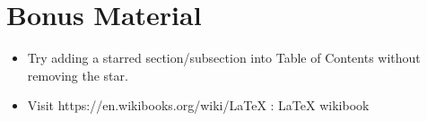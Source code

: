 \documentclass{article}
\begin{document}
\section*{Bonus Material}

\begin{itemize}
	\item Try adding a starred section/subsection into Table of Contents without removing the star.
	\item Visit https://en.wikibooks.org/wiki/LaTeX : \LaTeX{} wikibook
\end{itemize}
\end{document}
